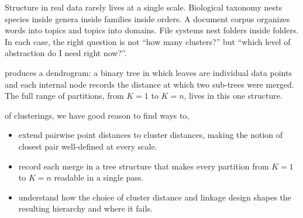 \begin{marginfigure}
    \caption{The canonical six points with all pairwise distances (dashed) and the full single-linkage hierarchy (solid). 
    The last merge connects $x_2$ and $x_4$ across the two groups. No centroids needed; 
    only pairwise distances drive the clustering.}
    \label{fig:why_canonical}
    \end{marginfigure}

 Structure in real data rarely lives at a single scale.
Biological taxonomy nests species inside genera inside families inside orders.
A document corpus organizes words into topics and topics into domains.
File systems nest folders inside folders.
In each case, the right question is not ``how many clusters?'' but ``which level of abstraction do I need right now?''.



 produces a dendrogram: a binary tree in
which leaves are individual data points and each internal node records the distance at
which two sub-trees were merged.
The full range of partitions, from $K{=}1$ to $K{=}n$, lives in this one structure.


 of clusterings, we have good reason to find ways to,
\begin{itemize}
    \item extend pairwise point distances to cluster distances, making the notion of closest pair well-defined at every scale.
    \item record each merge in a tree structure that makes every partition from $K{=}1$ to $K{=}n$ readable in a single pass.
    \item understand how the choice of cluster distance and linkage design shapes the resulting hierarchy and where it fails.
\end{itemize}





